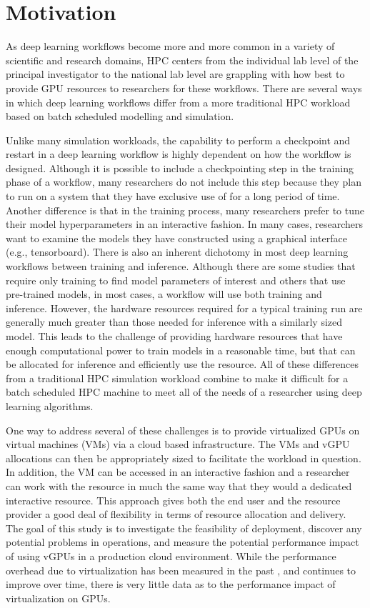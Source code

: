 \documentclass[acmsmall, authorversion]{acmart}
\begin{document}
\section{Motivation}\label{sec:motive}
As deep learning workflows become more and more common in a variety of scientific and research domains, HPC centers from the individual lab level of the principal investigator to the national lab level are grappling with how best to provide GPU resources to researchers for these workflows. There are several ways in which deep learning workflows differ from a more traditional HPC workload based on batch scheduled modelling and simulation.

Unlike many simulation workloads, the capability to perform a checkpoint and restart in a deep learning workflow is highly dependent on how the  workflow is designed. Although it is possible to include a checkpointing step in the training phase of a workflow, many researchers do not include this step because they plan to run on a system that they have exclusive use of for a long period of time. Another difference is that in the training process, many researchers prefer to tune their model hyperparameters in an interactive fashion. In many cases, researchers want to examine the models they have constructed using a graphical interface (e.g., tensorboard). There is also an inherent dichotomy in most deep learning workflows between training and inference. Although there are some studies that require only training to find model parameters of interest and others that use pre-trained models, in most cases, a workflow will use both training and inference. However, the hardware resources required for a typical training run are generally much greater than those needed for inference with a similarly sized model. This leads to the challenge of providing hardware resources that have enough computational power to train models in a reasonable time, but that can be allocated for inference and efficiently use the resource. All of these differences from a traditional HPC simulation workload combine to make it difficult for a batch scheduled HPC machine to meet all of the needs of a researcher using deep learning algorithms.

One way to address several of these challenges is to provide virtualized GPUs on virtual machines (VMs) via a cloud based infrastructure. The VMs and vGPU allocations can then be appropriately sized to facilitate the workload in question. In addition, the VM can be accessed in an interactive fashion and a researcher can work with the resource in much the same way that they would a dedicated interactive resource. This approach gives both the end user and the resource provider a good deal of flexibility in terms of resource allocation and delivery. The goal of this study is to investigate the feasibility of deployment, discover any potential problems in operations, and measure the potential performance impact of using vGPUs in a production cloud environment. While the  performance overhead due to virtualization has been measured in the past \cite{iuhypervisor}, and continues to improve over time, there is very little data as to the performance impact of virtualization on GPUs. 
\end{document}
